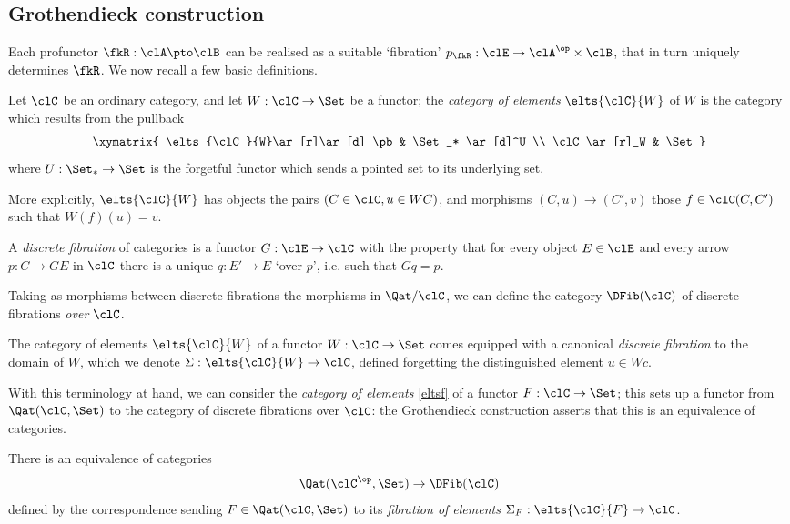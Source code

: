 \subsection{Gro\-then\-dieck construction}

Each profunctor $\fkR : \clA \pto \clB$ can be realised as a suitable `fibration' $p_\fkR : \clE \to \clA^\op\times\clB$, that in turn uniquely determines $\fkR$.
We now recall a few basic definitions.
\begin{definition}\label{eltsf}
	Let $\clC$ be an ordinary category, and let $W : \clC\to \Set$ be a functor; the \emph{category of elements} $\elts{\clC}{W}$ of $W$ is the category which results from the pullback
	\[
		\xymatrix{
			\elts{\clC}{W}\ar[r]\ar[d] \pb & \Set_* \ar[d]^U \\
			\clC \ar[r]_W & \Set
		}
	\]
	where $U : \Set_*\to\Set$ is the forgetful functor which sends a pointed set to its underlying set.

	More explicitly, $\elts{\clC}{W}$ has objects the pairs $(C\in\clC, u\in WC)$, and morphisms $(C,u)\to (C',v)$ those $f\in \clC(C,C')$ such that $W(f)(u)=v$.
\end{definition}
\begin{definition}
	\label{def:dfib}
	A \emph{discrete fibration} of categories is a functor $G : \clE \to \clC$ with the property that for every object $E\in\clE$ and every arrow $p : C\to GE$ in $\clC$ there is a unique $q : E'\to E$ `over $p$', i.e. such that $Gq=p$.
\end{definition}
Taking as morphisms between discrete fibrations the morphisms in $\Qat/\clC$, we can define the category $\DFib(\clC)$ of discrete fibrations \emph{over} $\clC$.
\begin{proposition}\label{fibelem}
	The category of elements $\elts{\clC}{W}$ of a functor $W : \clC\to \Set$ comes equipped with a canonical \emph{discrete fibration} to the domain of $W$, which we denote $\Sigma : \elts{\clC}{W}\to \clC$, defined forgetting the distinguished element $u\in Wc$.
\end{proposition}
With this terminology at hand, we can consider the \emph{category of elements} \autoref{eltsf} of a functor $F : \clC\to \Set$; this sets up a functor from $\Qat(\clC,\Set)$ to the category of discrete fibrations over $\clC$: the Gro\-then\-dieck construction asserts that this is an equivalence of categories.%
\begin{theorem}\label{thm:equconfib}
	There is an equivalence of categories
	\[
		\Qat(\clC^\op,\Set) \to \DFib(\clC)
	\]
	defined by the correspondence sending $F\in\Qat(\clC,\Set)$ to its \emph{fibration of elements}  $\Sigma_F : \elts{\clC}{F} \to \clC$.
\end{theorem}
